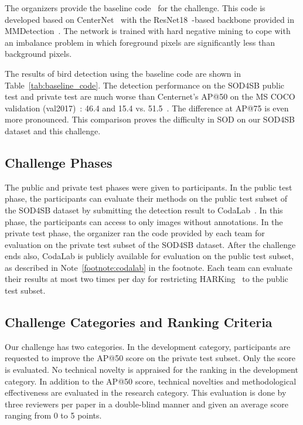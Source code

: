 \documentclass{mva_style}
\begin{document}
The organizers provide the baseline code~\cite{baselinecode_mva2023_sod_challenge} for the challenge.
This code is developed based on CenterNet~\cite{zhou2019objects} with the ResNet18~\cite{he2016deep}-based backbone provided in MMDetection~\cite{mmdetection}.
The network is trained with hard negative mining to cope with an imbalance problem in which foreground pixels are significantly less than background pixels.

The results of bird detection using the baseline code are shown in Table~\ref{tab:baseline_code}.
The detection performance on the SOD4SB public test and private test are much worse than Centernet's AP@50 on the MS COCO validation (val2017)~\cite{COCO_ECCV2014}: 46.4 and 15.4 vs. 51.5~\cite{zhou2019objects}. The difference at AP@75 is even more pronounced.
This comparison proves the difficulty in SOD on our SOD4SB dataset and this challenge.


\subsection{Challenge Phases}

The public and private test phases were given to participants.
In the public test phase, the participants can evaluate their methods on the public test subset of the SOD4SB dataset by submitting the detection result to CodaLab~\cite{codalab_competitions}.
In this phase, the participants can access to only images without annotations.
In the private test phase, the organizer ran the code provided by each team for evaluation on the private test subset of the SOD4SB dataset.
After the challenge ends also, CodaLab is publicly available for evaluation on the public test subset, as described in Note~\ref{footnote:codalab} in the footnote.
Each team can evaluate their results at most two times per day for restricting HARKing~\cite{kerr1998harking} to the public test subset.

\subsection{Challenge Categories and Ranking Criteria}
\label{subsection:categories}

Our challenge has two categories.
In the development category, participants are requested to improve the AP@50 score on the private test subset.
Only the score is evaluated.
No technical novelty is appraised for the ranking in the development category.
In addition to the AP@50 score, technical novelties and methodological effectiveness are evaluated in the research category.
This evaluation is done by three reviewers per paper in a double-blind manner and given an average score ranging from 0 to 5 points.
\end{document}

